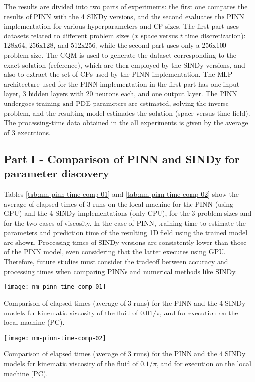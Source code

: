 \documentclass[conference]{IEEEtran}
\begin{document}
The results are divided into two parts of experiments: the first one compares the results of PINN with the 4 SINDy versions, and the second evaluates the PINN implementation for various hyperparameters and CP sizes. The first part uses datasets related to different problem sizes ($x$ space versus $t$ time discretization): 128x64, 256x128, and 512x256, while the second part uses only a 256x100 problem size. The GQM is used to generate the dataset corresponding to the exact solution (reference), which are then employed by the SINDy versions, and also to extract the set of CPs used by the PINN implementation. The MLP architecture used for the PINN implementation in the first part has one input layer, 3 hidden layers with 20 neurons each, and one output layer. The PINN undergoes training and PDE parameters are estimated, solving the inverse problem, and the resulting model estimates the solution (space versus time field). The processing-time data obtained in the all experiments is given by the average of 3  executions. 

\subsection{Part I - Comparison of PINN and SINDy for parameter discovery}

Tables \ref{tab:nm-pinn-time-comp-01} and \ref{tab:nm-pinn-time-comp-02} show  the average of elapsed times of 3 runs on the local machine for the PINN (using GPU) and the 4 SINDy implementations (only CPU), for the 3 problem sizes and for the two cases of viscosity.  In the case of PINN, training time to estimate the parameters and prediction time of the resulting 1D field using the trained model are shown. Processing times of SINDy versions are consistently lower than those of the PINN model, even considering that the latter executes using GPU. Therefore, future studies must consider the tradeoff between accuracy and processing times when comparing PINNs and numerical methods like SINDy. 


\begin{table}[htb]\centering
\texttt{[image: nm-pinn-time-comp-01]}
\caption{Comparison of elapsed times (average of 3 runs) for the PINN and the 4 SINDy models for kinematic viscosity of the fluid of ${0.01}/{\pi}$, and for execution on the local machine (PC).}
\label{tab:nm-pinn-time-comp-01}
\end{table}


\begin{table}[htb]\centering
\texttt{[image: nm-pinn-time-comp-02]}
\caption{Comparison of elapsed times (average of 3 runs) for the PINN and the 4 SINDy models for kinematic viscosity of the fluid of ${0.1}/{\pi}$, and for execution on the local machine (PC).}
\label{tab:nm-pinn-time-comp-02}
\end{table}
\end{document}
